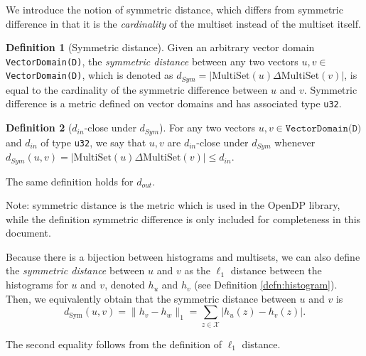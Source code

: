 \documentclass[11pt,a4paper]{article}
\theoremstyle{definition}
\newtheorem{definition}{Definition}[section]
\newcommand{\MultiSet}{\mathrm{MultiSet}}
\newcommand{\din}{d_{in}}
\newcommand{\dout}{d_{out}}
\newcommand{\silvia}[1]{{ {\color{blue}{(silvia)~#1}}}}
\newcommand{\connor}[1]{{ {\color{teal}{(connor)~#1}}}}
\begin{document}

We introduce the notion of symmetric distance, which differs from symmetric difference in that it is the \emph{cardinality} of the multiset instead of the multiset itself.

\begin{definition}[Symmetric distance]
Given an arbitrary vector domain \texttt{VectorDomain(D)}, %
the \textit{symmetric distance} between any two vectors $u, v \in$ \texttt{VectorDomain(D)}, %
which is denoted as $d_{Sym} = |\MultiSet(u) \Delta \MultiSet(v)|$, is equal to the cardinality of the symmetric difference between $u$ and $v$. Symmetric difference is a metric defined on vector domains and has associated type \texttt{u32}.
\end{definition}

\connor{Do you think we should leave out the associated type above? The associated type may be more of a job for the pseudocode definitions since types aren't really mentioned in this doc.}

\begin{definition}[$\din$-close under $d_{Sym}$]
    For any two vectors $u, v \in \texttt{VectorDomain(D)}$ and $\din$ of type \texttt{u32}, we say that $u, v$ are $\din$-close under $d_{Sym}$ whenever $d_{Sym}(u, v) = |\MultiSet(u) \Delta \MultiSet(v)| \leq \din$.
\end{definition}

The same definition holds for $\dout$.

Note: symmetric distance is the metric which is used in the OpenDP library, while the definition symmetric difference is only included for completeness in this document.

Because there is a bijection between histograms and multisets, we can also define the \emph{symmetric distance} between $u$ and $v$ as the $\ell_1$ distance between the histograms for $u$ and $v$, denoted $h_u$ and $h_v$ (see Definition \ref{defn:histogram}). Then, we equivalently obtain that the symmetric distance between $u$ and $v$ is
$$d_{\text{Sym}}(u,v) = \lVert h_{v} - h_{w}\rVert_1 = \sum_{z\in \mathcal{X}} |h_u(z) - h_{v}(z)|.$$

The second equality follows from the definition of $\ell_1$ distance.

\silvia{Add the above as claim?}

\connor{Since these definitions are all written by us, I think we could say that we're defining symmetric distance as both things.}
\end{document}
